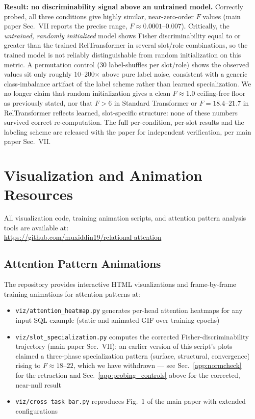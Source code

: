 \documentclass[conference]{IEEEtran}
\begin{document}
\textbf{Result: no discriminability signal above an untrained model.} Correctly probed, all three conditions give highly similar, near-zero-order $F$ values (main paper Sec.~VII reports the precise range, $F\approx0.0001$--$0.007$). Critically, the \emph{untrained, randomly initialized} model shows Fisher discriminability equal to or greater than the trained RelTransformer in several slot/role combinations, so the trained model is not reliably distinguishable from random initialization on this metric. A permutation control (30 label-shuffles per slot/role) shows the observed values sit only roughly 10--200$\times$ above pure label noise, consistent with a generic class-imbalance artifact of the label scheme rather than learned specialization. We no longer claim that random initialization gives a clean $F\approx1.0$ ceiling-free floor as previously stated, nor that $F>6$ in Standard Transformer or $F=18.4$--$21.7$ in RelTransformer reflects learned, slot-specific structure: none of these numbers survived correct re-computation. The full per-condition, per-slot results and the labeling scheme are released with the paper for independent verification, per main paper Sec.~VII.

\section{Visualization and Animation Resources}
\label{app:vis}

All visualization code, training animation scripts, and attention pattern analysis tools are available at:\\
\url{https://github.com/muxiddin19/relational-attention}

\subsection{Attention Pattern Animations}

The repository provides interactive HTML visualizations and frame-by-frame training animations for attention patterns at:
\begin{itemize}[noitemsep,topsep=2pt]
  \item \texttt{viz/attention\_heatmap.py}   generates per-head attention heatmaps for any input SQL example (static and animated GIF over training epochs)
  \item \texttt{viz/slot\_specialization.py}   computes the corrected Fisher-discriminability trajectory (main paper Sec.~VII); an earlier version of this script's plots claimed a three-phase specialization pattern (surface, structural, convergence) rising to $F\approx18$--$22$, which we have withdrawn --- see Sec.~\ref{app:normcheck} for the retraction and Sec.~\ref{app:probing_controls} above for the corrected, near-null result
  \item \texttt{viz/cross\_task\_bar.py}   reproduces Fig.~1 of the main paper with extended configurations
\end{itemize}
\end{document}
